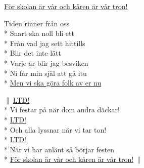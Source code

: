 \begin{SongText}
\begin{SongVerse}
        \underline{För skolan är vår och kåren är vår tron!}
    \end{SongVerse}
    \begin{SongVerse}
        Tiden rinner från oss\\*%
        Snart ska noll bli ett\\*%
        Från vad jag sett hittills\\*%
        Blir det inte lätt\\*%
        Varje år blir jag besviken\\*%
        Ni får min själ att gå itu\\*%
        \underline{Men vi ska göra folk av er nu}
    \end{SongVerse}
    \begin{SongVerse}
        $\|\:$\underline{LTD!}\\*%
        Vi festar på när dom andra däckar!\\*%
        \underline{LTD!}\\*%
        Och alla lyssnar när vi tar ton!\\*%
        \underline{LTD!}\\*%
        När vi har anlänt så börjar festen\\*%
        \underline{För skolan är vår och kåren är vår tron!}$\:\|$
    \end{SongVerse}
    
\end{SongText}
